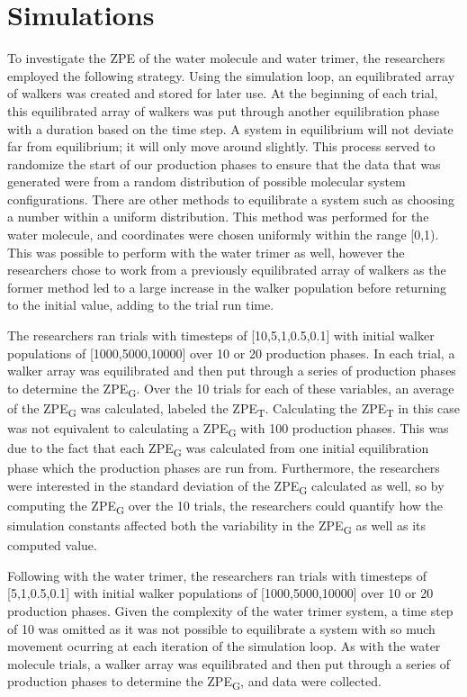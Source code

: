 \documentclass[journal=jacsat,manuscript=article]{achemso}
\begin{document}
\section{Simulations}

To investigate the ZPE of the water molecule and water trimer, the researchers employed the following strategy. Using the simulation loop, an equilibrated array of walkers was created and stored for later use. At the beginning of each trial, this equilibrated array of walkers was put through another equilibration phase with a duration based on the time step. A system in equilibrium will not deviate far from equilibrium; it will only move around slightly. This process served to randomize the start of our production phases to ensure that the data that was generated were from a random distribution of possible molecular system configurations. There are other methods to equilibrate a system such as choosing a number within a uniform distribution. This method was performed for the water molecule, and coordinates were chosen uniformly within the range [0,1). This was possible to perform with the water trimer as well\cite{Roinou2020}, however the researchers chose to work from a previously equilibrated array of walkers as the former method led to a large increase in the walker population before returning to the initial value, adding to the trial run time. 

The researchers ran trials with timesteps of [10,5,1,0.5,0.1] with initial walker populations of [1000,5000,10000] over 10 or 20 production phases. In each trial, a walker array was equilibrated and then put through a series of production phases to determine the ZPE\textsubscript{G}. Over the 10 trials for each of these variables, an average of the ZPE\textsubscript{G} was calculated, labeled the ZPE\textsubscript{T}. Calculating the ZPE\textsubscript{T} in this case was not equivalent to calculating a ZPE\textsubscript{G} with 100 production phases. This was due to the fact that each ZPE\textsubscript{G} was calculated from one initial equilibration phase which the production phases are run from. Furthermore, the researchers were interested in the standard deviation of the ZPE\textsubscript{G} calculated as well, so by computing the ZPE\textsubscript{G} over the 10 trials, the researchers could quantify how the simulation constants affected both the variability in the ZPE\textsubscript{G} as well as its computed value.

Following with the water trimer, the researchers ran trials with timesteps of [5,1,0.5,0.1] with initial walker populations of [1000,5000,10000] over 10 or 20 production phases. Given the complexity of the water trimer system, a time step of 10 was omitted as it was not possible to equilibrate a system with so much movement ocurring at each iteration of the simulation loop. As with the water molecule trials, a walker array was equilibrated and then put through a series of production phases to determine the ZPE\textsubscript{G}, and data were collected.
\end{document}
